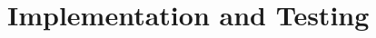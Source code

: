 \documentclass[../Report.tex]{subfiles}
\begin{document}
\chapter{Implementation and Testing}
\end{document}
